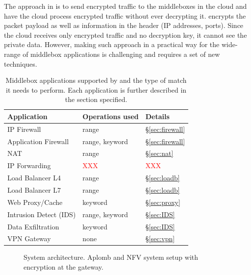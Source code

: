     The approach in \sys is to send encrypted traffic to the middleboxes in the cloud and have the cloud process encrypted traffic without ever decrypting it. \sys encrypts the packet payload as well as information in the header (IP addresses, ports). Since the cloud receives only encrypted traffic and no decryption key, it cannot see the private data. However, making such approach in a practical way for the wide-range of middlebox applications is challenging and requires a set of new techniques.
    
    
    
    
\begin{table}[t!]
\centering
\begin{tabular}{p{3.2cm}|p{2.9cm}|p{1cm}}
{\bf Application}  & {\bf Operations used} & {\bf Details} \\
\hline \hline
IP Firewall &   range  & \S\ref{sec:firewall} \\
Application Firewall & range, keyword  & \S\ref{sec:firewall}\\
NAT & range  & \S\ref{sec:nat} \\
IP Forwarding  & \textcolor{red}{XXX} &  \textcolor{red}{XXX} \\
Load Balancer L4 & range & \S\ref{sec:loadb}\\
Load Balancer L7  & range & \S\ref{sec:loadb}\\
Web Proxy/Cache  & keyword & \S\ref{sec:proxy}\\
Intrusion Detect (IDS)  & range, keyword & \S\ref{sec:IDS}\\
Data Exfiltration  & keyword & \S\ref{sec:IDS} \\
VPN Gateway &  none & \S\ref{sec:vpn} \\ 
\end{tabular}
\caption{Middlebox applications supported by \sys and the type of match it needs to perform. Each application is further described in the section specified. \label{tab:apps} }
\end{table}


\begin{figure}[t!]
\centering
{}
%
\hfill  
{}
     
\caption{System architecture. Aplomb and NFV system setup with \sys encryption  at the gateway. \label{fig:sys-overview}}
\end{figure}

